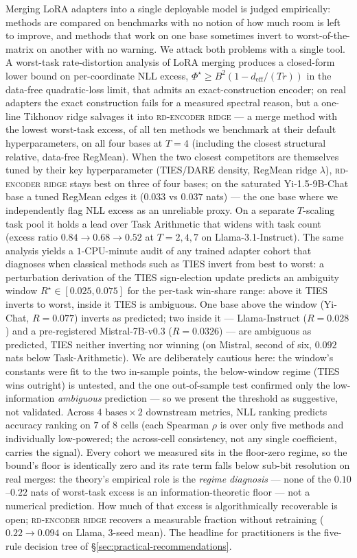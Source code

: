 Merging LoRA adapters into a single deployable model is judged
empirically: methods are compared on benchmarks with no notion of how
much room is left to improve, and methods that work on one base
sometimes invert to worst-of-the-matrix on another with no warning. We
attack both problems with a single tool. A worst-task rate-distortion
analysis of LoRA merging produces a closed-form lower bound on
per-coordinate NLL excess, $\Phi^\star \geq B^2 (1 - d_{\mathrm{eff}}
/ (Tr))$ in the data-free quadratic-loss limit, that admits an
exact-construction encoder; on real adapters the exact construction
fails for a measured spectral reason, but a one-line Tikhonov ridge
salvages it into \textsc{rd-encoder ridge} --- a merge method with the
lowest worst-task excess, of all ten methods we benchmark at their
default hyperparameters, on all four bases at $T = 4$ (including the
closest structural relative, data-free RegMean). When the two closest
competitors are themselves tuned by their key hyperparameter (TIES/DARE
density, RegMean ridge $\lambda$), \textsc{rd-encoder ridge} stays best
on three of four bases; on the saturated Yi-1.5-9B-Chat base a tuned
RegMean edges it ($0.033$ vs $0.037$ nats) --- the one base where we
independently flag NLL excess as an unreliable proxy. On a separate
$T$-scaling task pool it holds a lead over Task Arithmetic that widens
with task count (excess ratio $0.84 \to 0.68 \to 0.52$ at
$T = 2, 4, 7$ on Llama-3.1-Instruct). The same analysis yields a $1$-CPU-minute audit
of any trained adapter cohort that diagnoses when classical methods
such as TIES invert from best to worst: a perturbation derivation of
the TIES sign-election update predicts an ambiguity window
$R^\star \in [0.025, 0.075]$ for the per-task win-share range: above
it TIES inverts to worst, inside it TIES is ambiguous. One base above
the window (Yi-Chat, $R = 0.077$) inverts as predicted; two inside it
--- Llama-Instruct ($R = 0.028$) and a pre-registered Mistral-7B-v0.3
($R = 0.0326$) --- are ambiguous as predicted, TIES neither inverting
nor winning (on Mistral, second of six, $0.092$ nats below
Task-Arithmetic). We are deliberately cautious here: the window's
constants were fit to the two in-sample points, the below-window
regime (TIES wins outright) is untested, and the one out-of-sample
test confirmed only the low-information \emph{ambiguous} prediction ---
so we present the threshold as suggestive, not validated. Across
$4 \text{ bases} \times 2 \text{ downstream metrics}$, NLL ranking
predicts accuracy ranking on $7$ of $8$ cells (each Spearman $\rho$ is
over only five methods and individually low-powered; the across-cell
consistency, not any single coefficient, carries the signal). Every cohort we measured sits in the floor-zero regime, so the bound's
floor is identically zero and its rate term falls below sub-bit
resolution on real merges: the theory's empirical role is the
\emph{regime diagnosis} --- none of the $0.10$--$0.22$ nats of
worst-task excess is an information-theoretic floor --- not a numerical
prediction. How much of that excess is algorithmically recoverable is
open; \textsc{rd-encoder ridge} recovers a measurable fraction without
retraining ($0.22 \to 0.094$ on Llama, $3$-seed mean). The headline for practitioners
is the five-rule decision tree of \S\ref{sec:practical-recommendations}.
